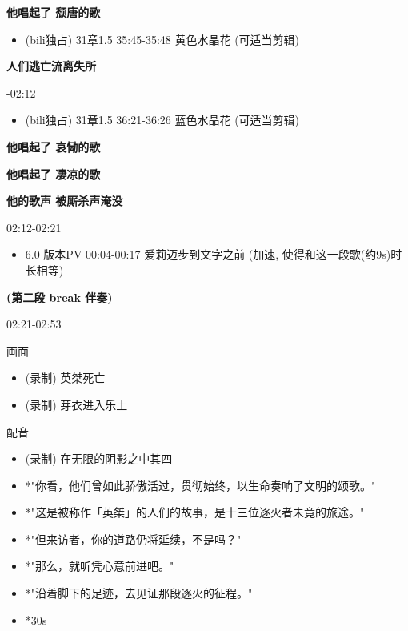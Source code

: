 \documentclass[a4paper]{article}
\begin{document}
\textbf{他唱起了 颓唐的歌}

\begin{itemize}
    \item (bili独占) 31章1.5 35:45-35:48 黄色水晶花 (可适当剪辑)
\end{itemize}

\textbf{人们逃亡流离失所}

-02:12

\begin{itemize}
    \item (bili独占) 31章1.5 36:21-36:26 蓝色水晶花 (可适当剪辑)
\end{itemize}

\textbf{他唱起了 哀恸的歌}

\textbf{他唱起了 凄凉的歌}

\textbf{他的歌声 被厮杀声淹没}

02:12-02:21

\begin{itemize}
    \item 6.0 版本PV 00:04-00:17 爱莉迈步到文字之前 (加速, 使得和这一段歌(约9s)时长相等)
\end{itemize}

\textbf{(第二段 break 伴奏)}

02:21-02:53

画面

\begin{itemize}
    \item (录制) 英桀死亡
    \item (录制) 芽衣进入乐土
\end{itemize}

配音

\begin{itemize}
    \item (录制) 在无限的阴影之中其四
    \item *"你看，他们曾如此骄傲活过，贯彻始终，以生命奏响了文明的颂歌。"
    \item *"这是被称作「英桀」的人们的故事，是十三位逐火者未竟的旅途。"
    \item *"但来访者，你的道路仍将延续，不是吗？"
    \item *"那么，就听凭心意前进吧。"
    \item *"沿着脚下的足迹，去见证那段逐火的征程。"
    \item *30s
\end{itemize}

\end{document}
